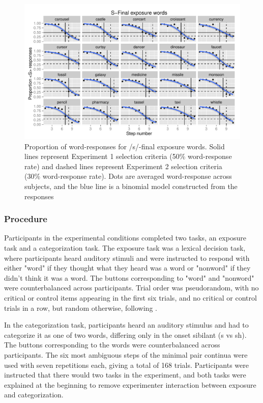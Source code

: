 \begin{figure}
\includegraphics[width=\textwidth]{sfinalpretest.pdf}
\caption{Proportion of word-responses for /s/-final exposure words. Solid lines represent Experiment 1 selection criteria (50\% word-response rate) and dashed lines represent Experiment 2 selection criteria (30\% word-response rate).  Dots are averaged word-response across subjects, and the blue line is a binomial model constructed from the responses}
\end{figure}

\subsubsection{Procedure}

Participants in the experimental conditions completed two tasks, an exposure task and a categorization task.  The exposure task was a lexical decision task, where participants heard auditory stimuli and were instructed to respond with either "word" if they thought what they heard was a word or "nonword" if they didn't think it was a word.  The buttons corresponding to "word" and "nonword" were counterbalanced across participants. Trial order was pseudorandom, with no critical or control items appearing in the first six trials, and no critical or control trials in a row, but random otherwise, following \citet{Reinisch2013}.

In the categorization task, participants heard an auditory stimulus and had to categorize it as one of two words, differing only in the onset sibilant (s vs sh).  The buttons corresponding to the words were counterbalanced across participants.  The six most ambiguous steps of the minimal pair continua were used with seven repetitions each, giving a total of 168 trials. Participants were instructed that there would two tasks in the experiment, and both tasks were explained at the beginning to remove experimenter interaction between exposure and categorization.  

